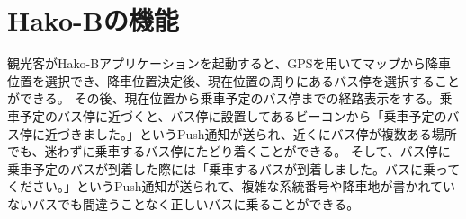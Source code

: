 \documentclass[openany,11pt,papersize]{jsbook}
\begin{document}
\section{Hako-Bの機能}
観光客がHako-Bアプリケーションを起動すると、GPSを用いてマップから降車位置を選択でき、降車位置決定後、現在位置の周りにあるバス停を選択することができる。
その後、現在位置から乗車予定のバス停までの経路表示をする。乗車予定のバス停に近づくと、バス停に設置してあるビーコンから「乗車予定のバス停に近づきました。」というPush通知が送られ、近くにバス停が複数ある場所でも、迷わずに乗車するバス停にたどり着くことができる。
そして、バス停に乗車予定のバスが到着した際には「乗車するバスが到着しました。バスに乗ってください。」というPush通知が送られて、複雑な系統番号や降車地が書かれていないバスでも間違うことなく正しいバスに乗ることができる。

\end{document}
